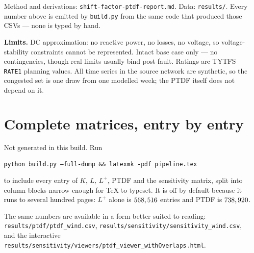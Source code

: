 \documentclass[11pt,a4paper]{article}
\newcommand{\Lp}{L^{+}}
\newcommand{\note}[1]{{\color{soft}\small #1}}
\begin{document}
\medskip
\note{Method and derivations: \texttt{shift-factor-ptdf-report.md}.
Data: \texttt{results/}. Every number above is emitted by \texttt{build.py}
from the same code that produced those CSVs --- none is typed by hand.}

\medskip
\note{\textbf{Limits.} DC approximation: no reactive power, no losses, no
voltage, so voltage-stability constraints cannot be represented. Intact base
case only --- no contingencies, though real limits usually bind post-fault.
Ratings are TYTFS \texttt{RATE1} planning values. All time series in the source
network are synthetic, so the congested set is one draw from one modelled week;
the PTDF itself does not depend on it.}

\appendix
\newpage
\section{Complete matrices, entry by entry}\label{app:dump}

\ifdefined\fulldump
  
  
  
  
  
\else
  Not generated in this build. Run
  \medskip

  \texttt{python build.py --full-dump \&\& latexmk -pdf pipeline.tex}
  \medskip

  \noindent to include every entry of $K$, $L$, $\Lp$, PTDF and the sensitivity
  matrix, split into column blocks narrow enough for \TeX{} to typeset. It is
  off by default because it runs to several hundred pages: $\Lp$ alone is
  $568,516$ entries and PTDF is $738,920$.

  \medskip
  \noindent The same numbers are available in a form better suited to reading:
  \texttt{results/ptdf/ptdf\_wind.csv},
  \texttt{results/sensitivity/sensitivity\_wind.csv}, and the interactive
  \texttt{results/sensitivity/viewers/ptdf\_viewer\_withOverlaps.html}.
\fi
\end{document}
